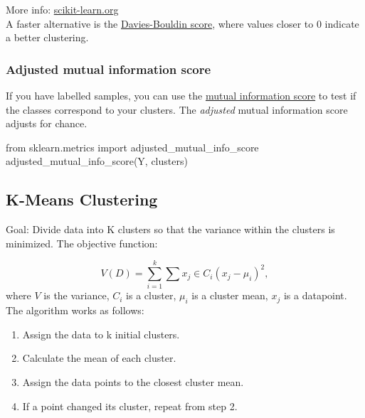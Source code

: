 \documentclass[
]{book}
\newenvironment{Shaded}{\begin{snugshade}}{\end{snugshade}}
\newcommand{\ImportTok}[1]{#1}
\newcommand{\NormalTok}[1]{#1}
\begin{document}
More info:
\href{https://scikit-learn.org/stable/modules/generated/sklearn.metrics.silhouette_score.html}{scikit-learn.org}\\

A faster alternative is the \href{https://scikit-learn.org/stable/modules/generated/sklearn.metrics.davies_bouldin_score.html}{Davies-Bouldin
score},
where values closer to 0 indicate a better clustering.

\hypertarget{adjusted-mutual-information-score}{%
\subsubsection{Adjusted mutual information score}\label{adjusted-mutual-information-score}}

If you have labelled samples, you can use the \protect\hyperlink{mutual_info}{mutual information
score} to test if the classes correspond to your clusters.
The \emph{adjusted} mutual information score adjusts for chance.

\begin{Shaded}
\begin{Highlighting}[]
\ImportTok{from}\NormalTok{ sklearn.metrics }\ImportTok{import}\NormalTok{ adjusted\_mutual\_info\_score}
\NormalTok{adjusted\_mutual\_info\_score(Y, clusters)}
\end{Highlighting}
\end{Shaded}

\hypertarget{k-means-clustering}{%
\subsection{K-Means Clustering}\label{k-means-clustering}}

Goal: Divide data into K clusters so that the variance within the
clusters is minimized. The objective function:

\[V(D) = \sum_{i=1}^k \sum{x_j \in C_i} (x_j - \mu_i)^2,\] where \(V\) is
the variance, \(C_i\) is a cluster, \(\mu_i\) is a cluster mean, \(x_j\) is a
datapoint. The algorithm works as follows:

\begin{enumerate}
\def\labelenumi{\arabic{enumi}.}
\item
  Assign the data to k initial clusters.
\item
  Calculate the mean of each cluster.
\item
  Assign the data points to the closest cluster mean.
\item
  If a point changed its cluster, repeat from step 2.
\end{enumerate}
\end{document}
